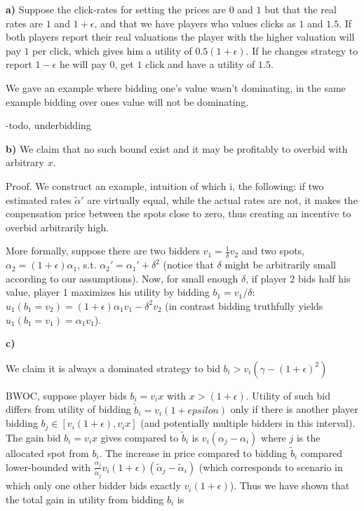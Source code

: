 


\textbf{a)} Suppose the click-rates for setting the prices are $0$ and $1$ but that the real rates are $1$ and $1+\epsilon$, and that we have players who values clicks as $1$ and $1.5$. If both players report their real valuations the player with the higher valuation will pay $1$ per click, which gives him a utility of $0.5(1+\epsilon)$. If he changes strategy to report $1-\epsilon$ he will pay $0$, get $1$ click and have a utility of $1.5$.

We gave an example where bidding one's value wasn't dominating, in the same example bidding over ones value will not be dominating.

-todo, underbidding



\textbf{b)} We claim that no such  bound exist and it may be profitably to overbid with arbitrary $x$. 

Proof. We construct an example, intuition of which i, the following: if two estimated rates $\tilde \alpha '$ are virtually equal, while the actual rates are not, it makes the conpensation price between the spots close to zero, thus creating an incentive to overbid arbitrarily high.

More formally, suppose there are two bidders $v_1=\frac{1}{\delta}v_2$ and two spots, $\alpha_2=(1+\epsilon)\alpha_1$, s.t. $\alpha_2'=\alpha_1'+\delta^2$ (notice that $\delta$ might be arbitrarily small according to our assumptions). Now, for small enough $\delta$, if player 2 bids half his value, player 1 maximizes his utility by bidding $b_1=v_1/\delta$: $u_1(b_1=v_2) = (1+\epsilon)\alpha_1 v_1 - \delta^2 v_2$ (in contrast bidding truthfully yields $u_1(b_1=v_1) = \alpha_1 v_1$).

\textbf{c)}


We claim it is always a dominated strategy to bid $b_i>v_i(\gamma-(1+\epsilon)^2)$

BWOC, suppose player bids $b_i=v_ix$ with $x>(1+\epsilon)$. Utility of such bid differs from utility of bidding $\tilde b_i=v_i(1+epsilon)$ only if there is another player bidding $b_j\in[v_i(1+\epsilon),v_ix]$ (and potentially multiple bidders in this interval). The gain bid $b_i=v_ix$ gives compared to $\tilde b_i$ is $v_i(\alpha_j-\alpha_i)$ where $j$ is the allocated spot from $b_i$. The increase in price compared to bidding $\tilde b_i$ compared lower-bounded with $\frac{\alpha_j}{\tilde \alpha_j}v_i(1+\epsilon)(\tilde \alpha_j-\tilde \alpha_i)$ (which corresponds to scenario in which only one other bidder bids exactly $v_i(1+\epsilon)$). Thus we have shown that the total gain in utility from bidding $b_i$ is

